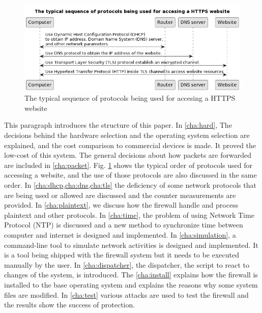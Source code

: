 \documentclass[mscthesis]{usiinfthesis}
\begin{document}
\paragraph{}
\begin{figure}[H]
  \centering
  \includegraphics[width=\textwidth]{graphics/puml/typical-sequence-of-https.png}
  \caption{The typical sequence of protocols being used for accesing a HTTPS website}
  \label{fig:typical-sequence}
\end{figure}
This paragraph introduces the structure of this paper. In \cref{cha:hard}, The decisions behind the hardware selection and the operating system selection are explained, and the cost comparison to commercial devices is made. It proved the low-cost of this system. The general decisions about how packets are forwarded are included in \cref{cha:packet}. Fig. \ref{fig:typical-sequence} shows the typical order of protocols used for accessing a website, and the use of those protocols are also discussed in the same order. In \cref{cha:dhcp,cha:dns,cha:tls} the deficiency of some network protocols that are being used or allowed are discussed and the counter measurements are provided. In \cref{cha:plaintext}, we discuss how the firewall handle and process plaintext and other protocols. In \cref{cha:time}, the problem of using Network Time Protocol (NTP) is discussed and a new method to synchronize time between computer and internet is designed and implemented. In \cref{cha:simulation}, a command-line tool to simulate network activities is designed and implemented. It is a tool being shipped with the firewall system but it needs to be executed manually by the user. In \cref{cha:dispatcher}, the dispatcher, the script to react to changes of the system, is introduced. The \cref{cha:install} explains how the firewall is installed to the base operating system and explains the reasons why some system files are modified. In \cref{cha:test} various attacks are used to test the firewall and the results show the success of protection.
\end{document}
